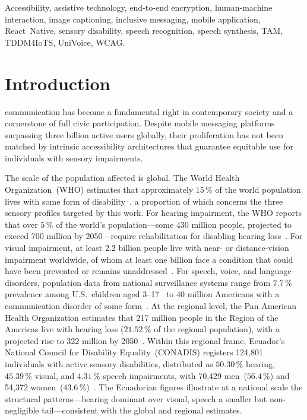 \documentclass[journal]{IEEEtran}
\begin{document}
	\begin{IEEEkeywords}
		Accessibility, assistive technology, end-to-end encryption,
		human-machine interaction, image captioning, inclusive messaging,
		mobile application, React~Native, sensory disability, speech
		recognition, speech synthesis, TAM, TDDM4IoTS, UniVoice, WCAG.
	\end{IEEEkeywords}
	
	\section{Introduction}
	\label{sec:intro}
	 communication has become a fundamental right in contemporary society and a cornerstone of full civic participation. Despite mobile messaging platforms surpassing three billion active users globally, their proliferation has not been matched by intrinsic accessibility architectures that guarantee equitable use for individuals with sensory impairments.
	
	The scale of the population affected is global. The World Health Organization~(WHO) estimates that approximately $15\,\%$ of the world population lives with some form of disability~\cite{who2011}, a proportion of which concerns the three sensory profiles targeted by this work. For hearing impairment, the WHO reports that over $5\,\%$ of the world's population---some 430 million people, projected to exceed 700 million by 2050---require rehabilitation for disabling hearing loss~\cite{who2021hearing}. For visual impairment, at least 2.2 billion people live with near- or distance-vision impairment worldwide, of whom at least one billion face a condition that could have been prevented or remains unaddressed~\cite{who2023vision}. For speech, voice, and language disorders, population data from national surveillance systems range from $7.7\,\%$ prevalence among U.S.\ children aged 3--17~\cite{nidcd2024} to 40 million Americans with a communication disorder of some form~\cite{asha2023}. At the regional level, the Pan American Health Organization estimates that 217 million people in the Region of the Americas live with hearing loss ($21.52\,\%$ of the regional population), with a projected rise to 322 million by 2050~\cite{paho2023hearing}. Within this regional frame, Ecuador's National Council for Disability Equality~(CONADIS) registers 124{,}801 individuals with active sensory disabilities, distributed as $50.30\,\%$ hearing, $45.39\,\%$ visual, and $4.31\,\%$ speech impairments, with 70{,}429 men~($56.4\,\%$) and 54{,}372 women~($43.6\,\%$)~\cite{conadis2024}. The Ecuadorian figures illustrate at a national scale the structural patterns---hearing dominant over visual, speech a smaller but non-negligible tail---consistent with the global and regional estimates.
	
\end{document}
